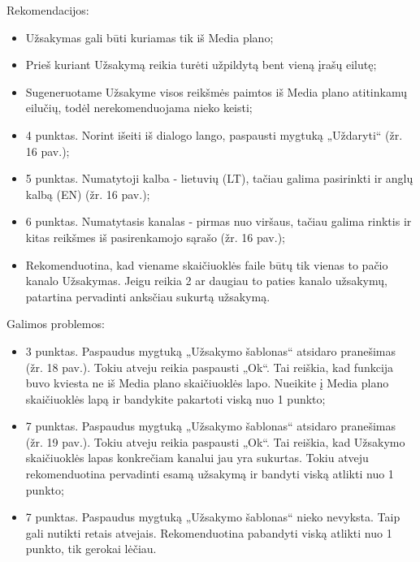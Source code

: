 \bigskip
Rekomendacijos:
\begin{itemize}
    \itemsep0em 
    \item Užsakymas gali būti kuriamas tik iš Media plano;
    \item Prieš kuriant Užsakymą reikia turėti užpildytą bent vieną įrašų eilutę;
    \item Sugeneruotame Užsakyme visos reikšmės paimtos iš Media plano atitinkamų eilučių, todėl nerekomenduojama nieko keisti;
    \item 4 punktas. Norint išeiti iš dialogo lango, paspausti mygtuką „Uždaryti“ (žr. 16 pav.);
    \item 5 punktas. Numatytoji kalba - lietuvių (LT), tačiau galima pasirinkti ir anglų kalbą (EN) (žr. 16 pav.);
    \item 6 punktas. Numatytasis kanalas - pirmas nuo viršaus, tačiau galima rinktis ir kitas reikšmes iš pasirenkamojo sąrašo (žr. 16 pav.);
    \item Rekomenduotina, kad viename skaičiuoklės faile būtų tik vienas to pačio kanalo Užsakymas. Jeigu reikia 2 ar daugiau to paties kanalo užsakymų, patartina pervadinti anksčiau sukurtą užsakymą.
\end{itemize}

\bigskip
Galimos problemos:
\begin{itemize}
    \itemsep0em 
    \item 3 punktas. Paspaudus mygtuką „Užsakymo šablonas“ atsidaro pranešimas (žr. 18 pav.). Tokiu atveju reikia paspausti „Ok“. Tai reiškia, kad funkcija buvo kviesta ne iš Media plano skaičiuoklės lapo. Nueikite į Media plano skaičiuoklės lapą ir bandykite pakartoti viską nuo 1 punkto;
    \item 7 punktas. Paspaudus mygtuką „Užsakymo šablonas“ atsidaro pranešimas (žr. 19 pav.). Tokiu atveju reikia paspausti „Ok“. Tai reiškia, kad Užsakymo skaičiuoklės lapas konkrečiam kanalui jau yra sukurtas. Tokiu atveju rekomenduotina pervadinti esamą užsakymą ir bandyti viską atlikti nuo 1 punkto;
    \item 7 punktas. Paspaudus mygtuką „Užsakymo šablonas“ nieko nevyksta. Taip gali nutikti retais atvejais. Rekomenduotina pabandyti viską atlikti nuo 1 punkto, tik gerokai lėčiau. 
\end{itemize}

